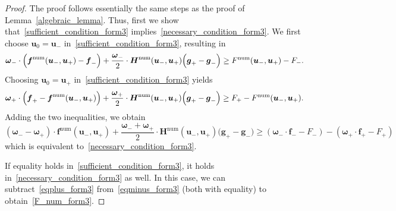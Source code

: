 \documentclass[]{scrartcl}
\renewcommand{\vec}[1]{\boldsymbol{#1}}
\theoremstyle{definition}
\begin{document}
\begin{proof}
The proof follows essentially the same steps as the proof of Lemma~\ref{algebraic_lemma}.
Thus, first we show that~\eqref{sufficient_condition_form3} implies~\eqref{necessary_condition_form3}.
We first choose $\vec{u}_0 = \vec{u}_-$ in~\eqref{sufficient_condition_form3}, resulting in
\begin{equation}
\vec{\omega}_- \cdot \Bigl (\vec{f}^{\mathrm{num}}(\vec{u}_-, \vec{u}_+) - \vec{f}_- \Bigr ) + \frac{\vec{\omega}_-}{2} \cdot \vec{H}^{\mathrm{num}}(\vec{u}_-, \vec{u}_+) \Bigl (\vec{g}_+ - \vec{g}_- \Bigr ) \geq F^{\mathrm{num}}(\vec{u}_-, \vec{u}_+) - F_-.
\label{eqminus_form3}
\end{equation}
Choosing $\vec{u}_0 = \vec{u}_+$ in~\eqref{sufficient_condition_form3} yields
\begin{equation}
\vec{\omega}_+ \cdot \Bigl (\vec{f}_+ - \vec{f}^{\mathrm{num}}(\vec{u}_-, \vec{u}_+) \Bigr )+ \frac{\vec{\omega}_+}{2} \cdot \vec{H}^{\mathrm{num}}(\vec{u}_-, \vec{u}_+) \Bigl (\vec{g}_+ - \vec{g}_- \Bigr ) \geq F_+ - F^{\mathrm{num}}(\vec{u}_-, \vec{u}_+) .
\label{eqplus_form3}
\end{equation}
Adding the two inequalities, we obtain
\begin{equation}
( \vec{\omega}_- - \vec{\omega}_+ ) \cdot \vec{f}^{\mathrm{num}}(\vec{u}_-, \vec{u}_+) + \frac{\vec{\omega}_- + \vec{\omega}_+}{2} \cdot \vec{H}^{\mathrm{num}}(\vec{u}_-, \vec{u}_+) \big (\vec{g}_+ - \vec{g}_- \big )  \geq (\vec{\omega}_- \cdot \vec{f}_- - F_-) - ( \vec{\omega}_+ \cdot \vec{f}_+ -F_+)
\end{equation}
which is equivalent to~\eqref{necessary_condition_form3}.

If equality holds in~\eqref{sufficient_condition_form3}, it holds in~\eqref{necessary_condition_form3} as well.
In this case, we can subtract~\eqref{eqplus_form3} from~\eqref{eqminus_form3} (both with equality) to obtain~\eqref{F_num_form3}.


\end{proof}
\end{document}
